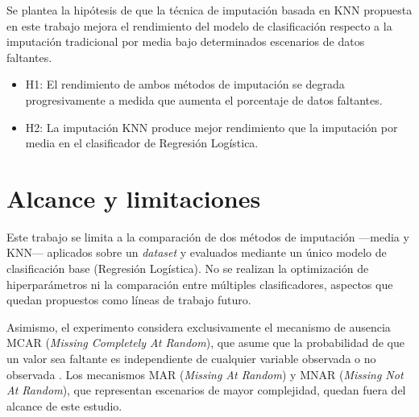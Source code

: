 Se plantea la hipótesis de que la técnica de imputación basada en KNN propuesta en este trabajo mejora el rendimiento del modelo de clasificación respecto a la imputación tradicional por media bajo determinados escenarios de datos faltantes.

\begin{itemize}
    \item H1: El rendimiento de ambos métodos de imputación se degrada progresivamente a medida que aumenta el porcentaje de datos faltantes.
    \item H2: La imputación KNN produce mejor rendimiento que la imputación por media en el clasificador de Regresión Logística.
\end{itemize}

\section{Alcance y limitaciones}

Este trabajo se limita a la comparación de dos métodos de imputación
—media y KNN— aplicados sobre un  \textit{dataset} y evaluados mediante un único modelo de clasificación base (Regresión Logística). 
No se realizan la optimización de hiperparámetros ni la comparación entre múltiples clasificadores, aspectos que quedan propuestos como líneas de trabajo futuro.

Asimismo, el experimento considera exclusivamente el mecanismo de ausencia
MCAR (\textit{Missing Completely At Random}), que asume que la probabilidad
de que un valor sea faltante es independiente de cualquier variable observada
o no observada \parencite{little2019}. Los mecanismos MAR (\textit{Missing
At Random}) y MNAR (\textit{Missing Not At Random}), que representan
escenarios de mayor complejidad, quedan fuera del alcance de este estudio.






